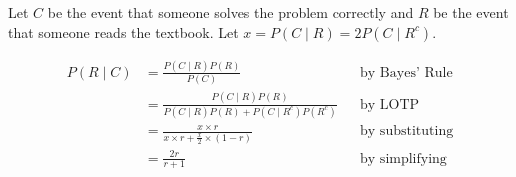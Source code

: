 \documentclass[12pt,oneside]{article}
\theoremstyle{definition}
\theoremstyle{remark}
\begin{document}
\begin{solutionbox}
Let $C$ be the event that someone solves the problem correctly and $R$ be the event that someone reads the textbook. Let $x = P(C \mid R) = 2 P(C \mid R^c)$.

\[
\begin{aligned}
P(R \mid C) &= \frac{P(C \mid R) P(R)}{P(C)} && \text{by Bayes' Rule} \\
&= \frac{P(C \mid R) P(R)}{P(C \mid R) P(R) + P(C \mid R^c) P(R^c)} && \text{by LOTP} \\
&= \frac{x \times r}{x \times r + \frac{x}{2} \times (1 - r)} && \text{by substituting} \\
&= \frac{2r}{r + 1} && \text{by simplifying}
\end{aligned}
\]
\end{solutionbox}
\end{document}

